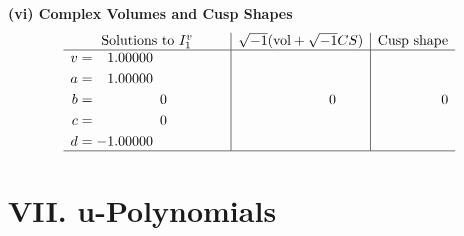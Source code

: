 \documentclass[1p]{elsarticle_modified}
\theoremstyle{definition}
\newcommand{\I}{\sqrt{-1}}
\begin{document}
\newpage\flushleft \textbf{(vi) Complex Volumes and Cusp Shapes}
$$\begin{array}{c|c|c}  
\text{Solutions to }I^v_{1}& \I (\text{vol} + \sqrt{-1}CS) & \text{Cusp shape}\\
 \hline 
\begin{aligned}
v &= \phantom{-}1.00000\phantom{ +0.000000I} \\
a &= \phantom{-}1.00000\phantom{ +0.000000I} \\
b &= \phantom{-0.000000 } 0 \\
c &= \phantom{-0.000000 } 0 \\
d &= -1.00000\phantom{ +0.000000I}\end{aligned}
 & \phantom{-0.000000 } 0 & \phantom{-0.000000 } 0\\
 \hline 
 \end{array}$$\newpage
\newpage\renewcommand{\arraystretch}{1}
\centering \section*{ VII. u-Polynomials}
\end{document}
